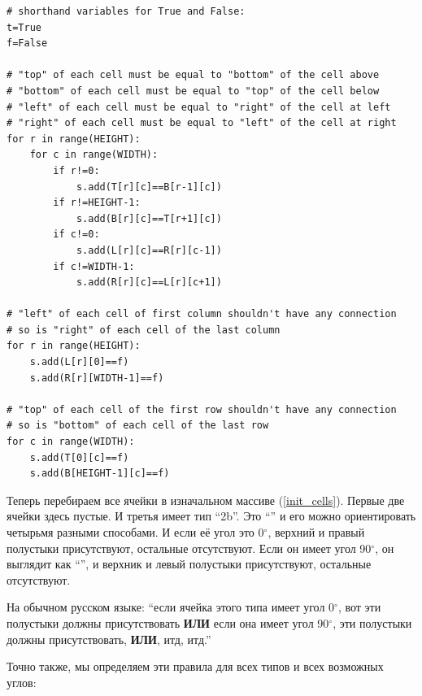 \begin{lstlisting}
# shorthand variables for True and False:
t=True
f=False

# "top" of each cell must be equal to "bottom" of the cell above
# "bottom" of each cell must be equal to "top" of the cell below
# "left" of each cell must be equal to "right" of the cell at left
# "right" of each cell must be equal to "left" of the cell at right
for r in range(HEIGHT):
    for c in range(WIDTH):
        if r!=0:
            s.add(T[r][c]==B[r-1][c])
        if r!=HEIGHT-1:
            s.add(B[r][c]==T[r+1][c])
        if c!=0:
            s.add(L[r][c]==R[r][c-1])
        if c!=WIDTH-1:
            s.add(R[r][c]==L[r][c+1])

# "left" of each cell of first column shouldn't have any connection
# so is "right" of each cell of the last column
for r in range(HEIGHT):
    s.add(L[r][0]==f)
    s.add(R[r][WIDTH-1]==f)

# "top" of each cell of the first row shouldn't have any connection
# so is "bottom" of each cell of the last row
for c in range(WIDTH):
    s.add(T[0][c]==f)
    s.add(B[HEIGHT-1][c]==f)
\end{lstlisting}

Теперь перебираем все ячейки в изначальном массиве (\ref{init_cells}).
Первые две ячейки здесь пустые. И третья имеет тип ``2b''.
Это ``'' %
и его можно ориентировать четырьмя разными способами.
И если её угол это 0$^{\circ}$, верхний и правый полустыки присутствуют, остальные отсутствуют.
Если он имеет угол 90$^{\circ}$, он выглядит как 
``'', %
и верхник и левый полустыки присутствуют, остальные отсутствуют.

На обычном русском языке: ``если ячейка этого типа имеет угол 0$^{\circ}$, вот эти полустыки должны присутствовать \textbf{ИЛИ}
если она имеет угол 90$^{\circ}$, эти полустыки должны присутствовать, \textbf{ИЛИ}, итд, итд.''

Точно также, мы определяем эти правила для всех типов и всех возможных углов:

